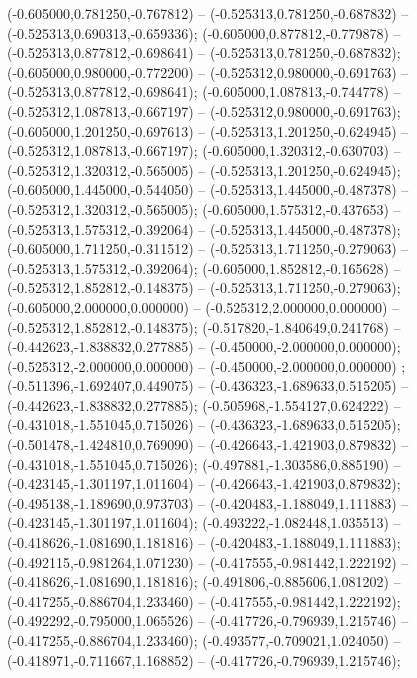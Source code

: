  (-0.605000,0.781250,-0.767812) -- (-0.525313,0.781250,-0.687832) -- (-0.525313,0.690313,-0.659336);
 (-0.605000,0.877812,-0.779878) -- (-0.525313,0.877812,-0.698641) -- (-0.525313,0.781250,-0.687832);
 (-0.605000,0.980000,-0.772200) -- (-0.525312,0.980000,-0.691763) -- (-0.525313,0.877812,-0.698641);
 (-0.605000,1.087813,-0.744778) -- (-0.525312,1.087813,-0.667197) -- (-0.525312,0.980000,-0.691763);
 (-0.605000,1.201250,-0.697613) -- (-0.525313,1.201250,-0.624945) -- (-0.525312,1.087813,-0.667197);
 (-0.605000,1.320312,-0.630703) -- (-0.525312,1.320312,-0.565005) -- (-0.525313,1.201250,-0.624945);
 (-0.605000,1.445000,-0.544050) -- (-0.525313,1.445000,-0.487378) -- (-0.525312,1.320312,-0.565005);
 (-0.605000,1.575312,-0.437653) -- (-0.525313,1.575312,-0.392064) -- (-0.525313,1.445000,-0.487378);
 (-0.605000,1.711250,-0.311512) -- (-0.525313,1.711250,-0.279063) -- (-0.525313,1.575312,-0.392064);
 (-0.605000,1.852812,-0.165628) -- (-0.525312,1.852812,-0.148375) -- (-0.525313,1.711250,-0.279063);
 (-0.605000,2.000000,0.000000) -- (-0.525312,2.000000,0.000000) -- (-0.525312,1.852812,-0.148375);
 (-0.517820,-1.840649,0.241768) -- (-0.442623,-1.838832,0.277885) -- (-0.450000,-2.000000,0.000000);
 (-0.525312,-2.000000,0.000000) -- (-0.450000,-2.000000,0.000000) ;
 (-0.511396,-1.692407,0.449075) -- (-0.436323,-1.689633,0.515205) -- (-0.442623,-1.838832,0.277885);
 (-0.505968,-1.554127,0.624222) -- (-0.431018,-1.551045,0.715026) -- (-0.436323,-1.689633,0.515205);
 (-0.501478,-1.424810,0.769090) -- (-0.426643,-1.421903,0.879832) -- (-0.431018,-1.551045,0.715026);
 (-0.497881,-1.303586,0.885190) -- (-0.423145,-1.301197,1.011604) -- (-0.426643,-1.421903,0.879832);
 (-0.495138,-1.189690,0.973703) -- (-0.420483,-1.188049,1.111883) -- (-0.423145,-1.301197,1.011604);
 (-0.493222,-1.082448,1.035513) -- (-0.418626,-1.081690,1.181816) -- (-0.420483,-1.188049,1.111883);
 (-0.492115,-0.981264,1.071230) -- (-0.417555,-0.981442,1.222192) -- (-0.418626,-1.081690,1.181816);
 (-0.491806,-0.885606,1.081202) -- (-0.417255,-0.886704,1.233460) -- (-0.417555,-0.981442,1.222192);
 (-0.492292,-0.795000,1.065526) -- (-0.417726,-0.796939,1.215746) -- (-0.417255,-0.886704,1.233460);
 (-0.493577,-0.709021,1.024050) -- (-0.418971,-0.711667,1.168852) -- (-0.417726,-0.796939,1.215746);
